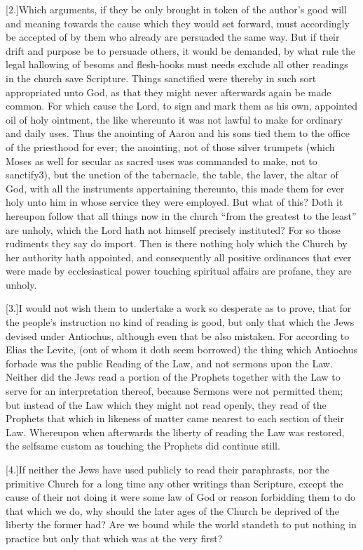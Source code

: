 [2.]Which arguments, if they be only brought in token of the author’s good will and meaning towards the cause which they would set forward, must accordingly be accepted of by them who already are persuaded the same way. But if their drift and purpose be to persuade others, it would be demanded,  by what rule the legal hallowing of besoms and flesh-hooks must needs exclude all other readings in the church save Scripture.
 Things sanctified were thereby in such sort appropriated unto God, as that they might never afterwards again be made common. For which cause the Lord, to sign and mark them as his own, appointed oil of holy ointment, the like whereunto it was not lawful to make for ordinary and daily uses. Thus the anointing of Aaron and his sons tied them to the office of the priesthood for ever; the anointing, not of those silver trumpets (which Moses as well for secular as sacred uses was commanded to make, not to sanctify3), but the unction of the tabernacle, the table, the laver, the altar of God, with all the instruments appertaining thereunto, this made them for ever holy unto him in whose service they were employed. But what of this? Doth it hereupon follow that all things now in the church “from the greatest to the least” are unholy, which the Lord hath not himself precisely instituted? For so those rudiments they say do import. Then is there nothing holy which the Church by her authority hath appointed, and consequently all positive ordinances that ever were made by ecclesiastical power touching spiritual affairs are profane, they are unholy.

[3.]I would not wish them to undertake a work so desperate as to prove, that for the people’s instruction no kind of reading is good, but only that which the Jews devised under Antiochus, although even that be also mistaken. For according to Elias the Levite, (out of whom it doth seem borrowed)  the thing which Antiochus forbade was the public Reading of the Law, and not sermons upon the Law.
 Neither did the Jews read a portion of the Prophets together with the Law to serve for an interpretation thereof, because Sermons were not permitted them; but instead of the Law which they might not read openly, they read of the Prophets that which in likeness of matter came nearest to each section of their Law. Whereupon when afterwards the liberty of reading the Law was restored, the selfsame custom as touching the Prophets did continue still.

[4.]If neither the Jews have used publicly to read their paraphrasts, nor the primitive Church for a long time any other writings than Scripture, except the cause of their not doing it were some law of God or reason forbidding them to do that which we do, why should the later ages of the Church be deprived of the liberty the former had? Are we bound while the world standeth to put nothing in practice but only that which was at the very first?


